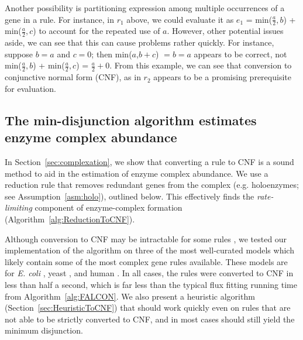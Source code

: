 Another possibility is partitioning expression among multiple occurrences
of a gene in a rule. For instance, in $r_1$ above, we could evaluate
it as $e_1$ =
min($\frac{a}{2},b$) + min($\frac{a}{2},c$) to account for the
repeated use of $a$. However, other potential issues aside, we can see
that this can cause problems rather quickly. For instance, suppose $b
= a$ and $c = 0$; then min($a$,$b+c$) $=b=a$ appears to be correct,
not min($\frac{a}{2},b$) + min($\frac{a}{2},c$) = $\frac{a}{2} + 0$.
From this example, we can see that conversion to conjunctive normal
form (CNF), as in $r_2$ appears to be a promising prerequisite for evaluation.

\subsection{The min-disjunction algorithm estimates \\enzyme complex abundance}

In \suppOrApp Section~\ref{sec:complexation}, we show that
converting a rule to CNF is a sound method
to aid in the estimation of enzyme complex abundance. We use a
reduction rule that removes redundant genes from the complex
(e.g. holoenzymes; see \suppOrApp Assumption~\ref{asm:holo}), outlined
below. This effectively finds the \emph{rate-limiting} component of
enzyme-complex formation (\suppOrApp Algorithm~\ref{alg:ReductionToCNF}).

Although conversion to CNF may be intractable for some rules
\citep{Russell2009}, we tested our implementation of the algorithm on
three of the most well-curated models which likely contain some of the
most complex gene rules available. These models are for \textit{E. coli}
\citep{Orth2011a}, yeast \citep{Aung2013}, and human
\citep{Thiele2013}. In all cases, the rules were converted to CNF in
less than half a second, which is far less than the typical flux
fitting running time from \suppOrApp Algorithm~\ref{alg:FALCON}. We also present
a heuristic algorithm (Section~\ref{sec:HeuristicToCNF}) that should
work quickly even on rules that are not able to be strictly converted
to CNF, and in most cases should still yield the minimum disjunction.

